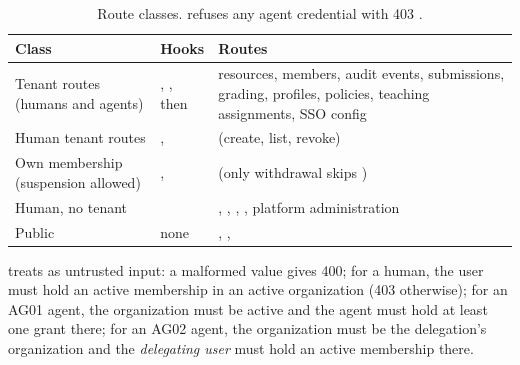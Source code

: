 \begin{table}[H]
\centering
\small
\begin{tabularx}{\textwidth}{@{}P{3.0cm} P{5.0cm} L@{}}
\toprule
\textbf{Class} & \textbf{Hooks} & \textbf{Routes}\\
\midrule
Tenant routes (humans and agents) & , , then  & resources, members, audit events, submissions, grading, profiles, policies, teaching assignments, SSO config\\
Human tenant routes & ,  &  (create, list, revoke)\\
Own membership (suspension allowed) & ,  &  (only withdrawal skips )\\
Human, no tenant &  & , , , , platform administration\\
Public & none & , , \\
\bottomrule
\end{tabularx}
\caption{Route classes.  refuses any agent credential with 403 .}
\end{table}

 treats  as untrusted input: a malformed value gives 400; for a human, the user must hold an active membership in an active organization (403 otherwise); for an AG01 agent, the organization must be active and the agent must hold at least one grant there; for an AG02 agent, the organization must be the delegation's organization and the \emph{delegating user} must hold an active membership there.


